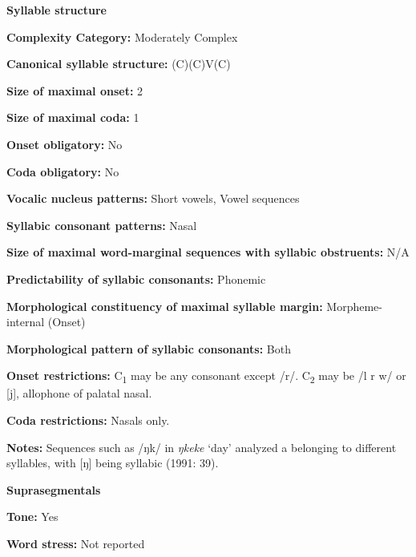 \textbf{Syllable structure}



\textbf{Complexity Category:} Moderately Complex



\textbf{Canonical syllable structure:} (C)(C)V(C) \citep[38-9]{Ameka1991}



\textbf{Size of maximal onset:} 2



\textbf{Size of maximal coda:} 1



\textbf{Onset obligatory:} No



\textbf{Coda obligatory:} No



\textbf{Vocalic nucleus patterns:} Short vowels, Vowel sequences



\textbf{Syllabic consonant patterns:} Nasal



\textbf{Size of maximal word{}-marginal sequences with syllabic obstruents:} N/A



\textbf{Predictability of syllabic consonants:} Phonemic



\textbf{Morphological constituency of maximal syllable margin:} Morpheme-internal (Onset)



\textbf{Morphological pattern of syllabic consonants:} Both



\textbf{Onset restrictions:} C\textsubscript{1} may be any consonant except /r/. C\textsubscript{2} may be /l r w/ or [j], allophone of palatal nasal.



\textbf{Coda restrictions:} Nasals only.



\textbf{Notes:} Sequences such as /ŋk/ in \textit{ŋkeke} ‘day’ analyzed a belonging to different syllables, with [ŋ] being syllabic (1991: 39).



\textbf{Suprasegmentals}



\textbf{Tone:} Yes



\textbf{Word stress:} Not reported



